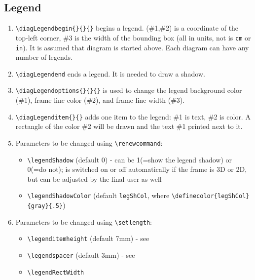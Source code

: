 \documentclass[12pt]{article}
\begin{document}
\subsection{Legend \label{sec:3.4}}
\begin{enumerate}
\item \verb+\diagLegendbegin{}{}{}+ 
  begins a legend. 
  (\#1,\#2) is a coordinate of the top-left corner, \#3 is the width
  of the bounding box (all in units, not is \texttt{cm} or \texttt{in}).
  It is assumed
  that diagram is started above. Each diagram can have any number of
  legends. 
\item \verb+\diagLegendend+ 
  ends a legend. It is needed to draw a shadow.
\item \verb+\diagLegendoptions{}{}{}+ 
  is used to change the legend
  background color  (\#1), frame line color (\#2), and frame line
  width (\#3).
\item \verb+\diagLegenditem{}{}+ 
  adds one item to the legend: \#1 is
  text, \#2 is color. A rectangle of the color \#2 will be drawn and
  the text \#1 printed next to it.
\item Parameters to be changed using \verb+\renewcommand+:
      \begin{itemize} 
        \item \verb+\legendShadow+ 
          (default 0) - can be 1(=show the
          legend shadow) or 0(=do not); is switched on or off
          automatically if the frame is 3D or 2D, but can be adjusted
          by the final user as well
        \item \verb+\legendShadowColor+ 
          (default \verb+legShCol+,
          where \verb+\definecolor{legShCol}{gray}{.5}+)       
      \end{itemize}
%
\item Parameters to be changed using \verb+\setlength+:
      \begin{itemize} 
        \item \verb+\legenditemheight+ 
              (default 7mm) - see 
        \item \verb+\legendspacer+  
              (default 3mm) - see 
        \item \verb+\legendRectWidth+ 

\end{itemize}
\end{enumerate}
\end{document}

